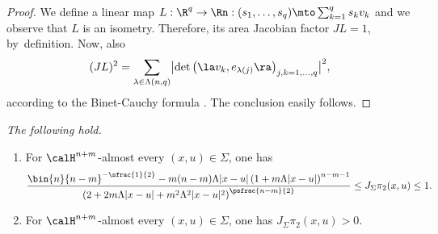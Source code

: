 \begin{proof}
We define a linear map $L: \R^q \to \Rn: (s_1,\ldots,s_q) \mto \sum_{k=1}^q s_k v_k$ and we observe that $L$ is an isometry.
Therefore, its area Jacobian factor $JL=1$, by~definition.
Now, also
\begin{equation*}
(JL)^2 = \sum_{\lambda \in \Lambda(n,q)}\bigl| \det \left(\la v_k, e_{\lambda(j)} \ra \right)_{j,k=1,\ldots,q}\bigr|^2,
\end{equation*}
according to the Binet-Cauchy formula \cite[Chap.\,3, \S 2, Th.\,4]{EVANS.GARIEPY}.
The conclusion easily follows.
\end{proof}

\pagebreak[2]
\begin{Empty}
\label{factor.pi.2}
{\it
The following hold.
\begin{enumerate}
\item\label{enum:24.1}
For $\calH^{n+m}$-almost every $(x,u) \in \Sigma$, one has
\begin{equation*}
\frac{\bin{n}{n-m}^{-\sfrac{1}{2}} - m(n-m) \Lambda |x-u| \left(1 + m \Lambda |x-u|\right)^{n-m-1}}{\left(2 + 2 m \Lambda |x-u| + m^2\Lambda^2|x-u|^2 \right)^{\psfrac{n-m}{2}}} \leq J_\Sigma \pi_2(x,u) \leq 1.
\end{equation*}
\item\label{enum:24.2}
For $\calH^{n+m}$-almost every $(x,u) \in \Sigma$, one has $J_\Sigma \pi_2(x,u) > 0$.
\end{enumerate}
}
\end{Empty}

